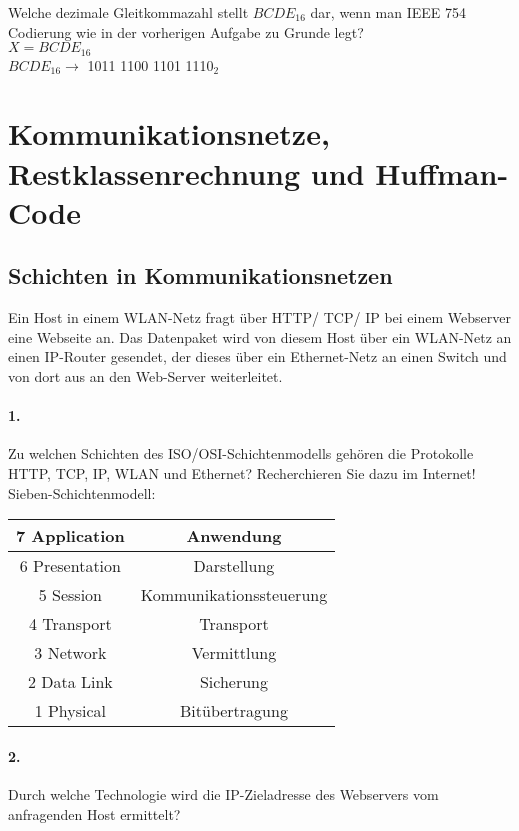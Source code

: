 \documentclass[paper=a4, fontsize=11pt]{scrartcl}
\numberwithin{equation}{section}
\numberwithin{figure}{section}
\numberwithin{table}{section}
\begin{document}
Welche dezimale Gleitkommazahl stellt $BCDE_{16}$ dar, wenn man IEEE 754 Codierung wie in der vorherigen Aufgabe zu Grunde legt? \\

$X=BCDE_{16}$ \\
$BCDE_{16} \rightarrow$ 1011 1100 1101 111$0_{2}$ \\


\section{Kommunikationsnetze, Restklassenrechnung und Huffman-Code}

\subsection{Schichten in Kommunikationsnetzen}
Ein Host in einem WLAN-Netz fragt über HTTP/ TCP/ IP bei einem Webserver eine Webseite an. Das Datenpaket wird von diesem Host über ein WLAN-Netz an einen IP-Router gesendet, der dieses über ein Ethernet-Netz an einen Switch und von dort aus an den Web-Server weiterleitet. \\

\paragraph{1.}
Zu welchen Schichten des ISO/OSI-Schichtenmodells gehören die Protokolle HTTP, TCP, IP, WLAN und Ethernet? Recherchieren Sie dazu im Internet! \\

Sieben-Schichtenmodell: \\
\begin{tabular}{|c|c|}
\hline
7 Application & Anwendung \\
\hline
6 Presentation & Darstellung \\
\hline
5 Session & Kommunikationssteuerung \\
\hline
4 Transport & Transport \\
\hline
3 Network & Vermittlung \\
\hline
2 Data Link & Sicherung \\
\hline
1 Physical & Bitübertragung\\
\hline
\end{tabular}

\paragraph{2.}
Durch welche Technologie wird die IP-Zieladresse des Webservers vom anfragenden Host ermittelt? \\
\end{document}
